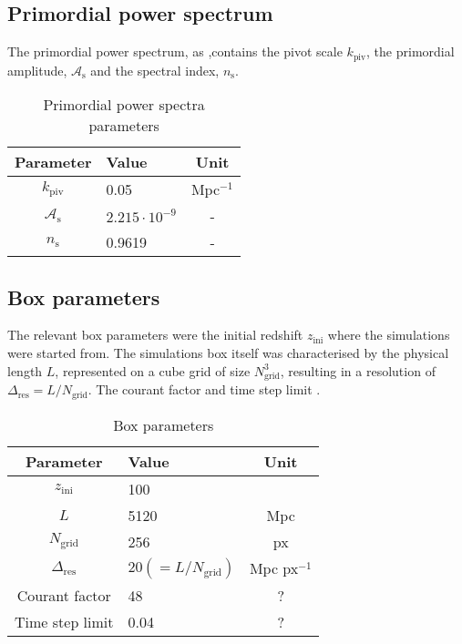     \subsection{Primordial power spectrum} 
    The primordial power spectrum, as ,contains the pivot scale $k_\mathrm{piv}$, the primordial amplitude, $\mathcal{A}_\mathrm{s}$ and the spectral index, $n_\mathrm{s}$.
        \begin{table}[h]\label{tab:simulations_primordial_parameters}
            \centering
            \caption{Primordial power spectra parameters}
            \begin{tabular}{c|l|c}
                \toprule
                \textbf{Parameter} & \textbf{Value} & \textbf{Unit} \\
                \midrule
                $k_\mathrm{piv}$ & 0.05 & Mpc$^{-1}$ \\
                $\mathcal{A}_\mathrm{s}$ & $2.215\cdot 10^{-9}$ & -\\
                $n_\mathrm{s}$ & 0.9619 & - \\
                \bottomrule
            \end{tabular}
        \end{table}

    \subsection{Box parameters}
    The relevant box parameters were the initial redshift $z_\mathrm{ini}$ where the simulations were started from. The simulations box itself was characterised by the physical length $L$, represented on a cube grid of size $N_\mathrm{grid}^3$, resulting in a resolution of $\Delta_\mathrm{res} = L/N_\mathrm{grid}$. The courant factor  and time step limit .
        \begin{table}[h]\label{tab:simulations_box_parameters}
            \centering
            \caption{Box parameters}
            \begin{tabular}{c|l|c}
                \toprule
                \textbf{Parameter} & \textbf{Value} & \textbf{Unit} \\
                \midrule
                $z_\mathrm{ini}$ & 100 &\\
                $L$ & 5120 & Mpc\\
                $N_\mathrm{grid}$ & 256 & px \\
                $\Delta_\mathrm{res}$ & $20 (=L/N_\mathrm{grid})$ & Mpc px$^{-1}$\\
                Courant factor & 48 & ? \\
                Time step limit & 0.04 & ? \\
                \bottomrule
            \end{tabular}
        \end{table}

